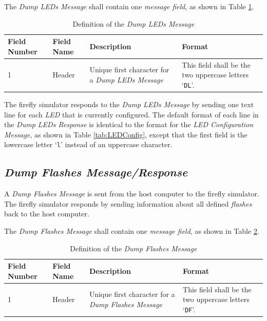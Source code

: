 \documentclass[letterpaper,11pt]{article}
\begin{document}
The \textit{Dump LEDs Message} shall contain one \textit{message field},
as shown in Table \ref{tab:DumpLEDs}.

\begin{table}[H]
  \caption{Definition of the \textit{Dump LEDs Message}}
  \centering
  \setlength\extrarowheight{2pt}
  \begin{tabular}[h]{|p{0.5in}|p{1.00in}|p{2.25in}|p{2.25in}|} \hline
    Field Number & Field Name & Description & Format \\ \hline
    1            & Header
    & Unique first character for a \textit{Dump LEDs Message}
    & This field shall be the two uppercase letters `\texttt{DL}'.
    \\ \hline
  \end{tabular}
  \label{tab:DumpLEDs}
\end{table}

The firefly simulator responds to the \textit{Dump LEDs Message} by
sending one text line for each \textit{LED} that is currently configured.
The default format of each line in the \textit{Dump LEDs Response} is identical
to the format for the \textit{LED Configuration Message}, as shown in
Table \ref{tab:LEDConfig}, except that the first field is the lowercase letter
`\texttt{l}' instead of an uppercase character.

\subsection{\textit{Dump Flashes Message/Response}}

A \textit{Dump Flashes Message} is sent from the host computer to the
firefly simulator. The firefly simulator responds by sending information
about all defined \textit{flashes} back to the host computer.

The \textit{Dump Flashes Message} shall contain one \textit{message field},
as shown in Table \ref{tab:DumpFlashes}.

\begin{table}[H]
  \caption{Definition of the \textit{Dump Flashes Message}}
  \centering
  \setlength\extrarowheight{2pt}
  \begin{tabular}[h]{|p{0.5in}|p{1.00in}|p{2.25in}|p{2.25in}|} \hline
    Field Number & Field Name & Description & Format \\ \hline
    1            & Header
    & Unique first character for a \textit{Dump Flashes Message}
    & This field shall be the two uppercase letters `\texttt{DF}'.
    \\ \hline
  \end{tabular}
  \label{tab:DumpFlashes}
\end{table}
\end{document}
